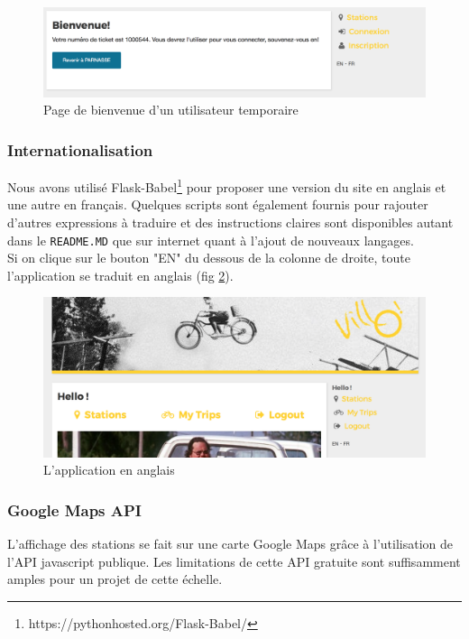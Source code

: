 \documentclass[a4paper]{article}
\begin{document}
    \begin{figure}
    \includegraphics[width=\textwidth]{images/s17.png}
    \caption{Page de bienvenue d'un utilisateur temporaire}
    \label{fig-s17}
    \end{figure}
    
    \subsubsection{Internationalisation}
    Nous avons utilisé Flask-Babel\footnote{https://pythonhosted.org/Flask-Babel/} pour proposer une version du site en anglais et une autre en français. Quelques scripts sont également fournis pour rajouter d'autres expressions à traduire et des instructions claires sont disponibles autant dans le \texttt{README.MD} que sur internet quant à l'ajout de nouveaux langages.\\
    
    Si on clique sur le bouton "EN" du dessous de la colonne de droite, toute l'application se traduit en anglais (fig \ref{fig-s21}). 
    \begin{figure}
    \includegraphics[width=\textwidth]{images/s21.png}
    \caption{L'application en anglais}
    \label{fig-s21}
    \end{figure}
    
    \subsubsection{Google Maps API}
    L'affichage des stations se fait sur une carte Google Maps grâce à l'utilisation de l'API javascript publique. Les limitations de cette API gratuite sont suffisamment amples pour un projet de cette échelle.
    
\end{document}
